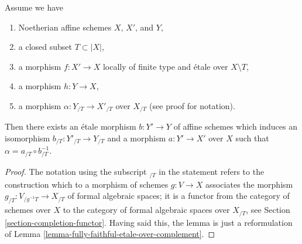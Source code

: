 \begin{lemma}
\label{lemma-algebraize-morphism-rig-etale}
Assume we have
\begin{enumerate}
\item Noetherian affine schemes $X$, $X'$, and $Y$,
\item a closed subset $T \subset |X|$,
\item a morphism $f : X' \to X$ locally of finite type
and \'etale over $X \setminus T$,
\item a morphism $h : Y \to X$,
\item a morphism $\alpha : Y_{/T} \to X'_{/T}$ over $X_{/T}$
(see proof for notation).
\end{enumerate}
Then there exists an \'etale morphism $b : Y' \to Y$ of affine schemes
which induces an isomorphism $b_{/T} : Y'_{/T} \to Y_{/T}$
and a morphism $a : Y' \to X'$ over $X$
such that $\alpha = a_{/T} \circ b_{/T}^{-1}$.
\end{lemma}

\begin{proof}
The notation using the subscript ${}_{/T}$ in the statement
refers to the construction which to a morphism of schemes $g : V \to X$
associates the morphism $g_{/T} : V_{/g^{-1}T} \to X_{/T}$ of formal
algebraic spaces; it is a functor from the category of schemes over $X$
to the category of formal algebraic spaces over $X_{/T}$, see
Section \ref{section-completion-functor}.
Having said this, the lemma is just a reformulation of
Lemma \ref{lemma-fully-faithful-etale-over-complement}.
\end{proof}
